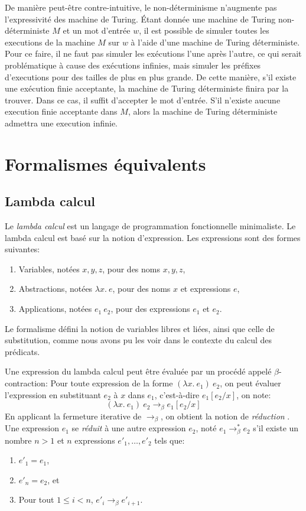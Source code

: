 De manière peut-être contre-intuitive, le non-déterminisme n'augmente pas l'expressivité des machine de Turing.
Étant donnée une machine de Turing non-déterministe $M$ et un mot d'entrée $w$, il est possible de simuler toutes les executions de la machine $M$ sur $w$ à l'aide d'une machine de Turing déterministe.
Pour ce faire, il ne faut pas simuler les exécutions l'une après l'autre, ce qui serait problématique à cause des exécutions infinies, mais simuler les préfixes d'executions pour des tailles de plus en plus grande.
De cette manière, s'il existe une exécution finie acceptante, la machine de Turing déterministe finira par la trouver.
Dans ce cas, il suffit d'accepter le mot d'entrée.
S'il n'existe aucune execution finie acceptante dans $M$, alors la machine de Turing déterministe admettra une execution infinie.

\section{Formalismes équivalents}

\subsection{Lambda calcul}

Le \og \textit{lambda calcul} \fg{} est un langage de programmation fonctionnelle minimaliste.
Le lambda calcul est basé sur la notion d'expression. Les expressions sont des formes suivantes:
\begin{enumerate}
\item Variables, notées $x, y, z$, pour des noms $x, y, z$,
\item Abstractions, notées $\lambda x. \ e$, pour des noms $x$ et expressions $e$,
\item Applications, notées $e_1\ e_2$, pour des expressions $e_1$ et $e_2$.
\end{enumerate}
Le formalisme défini la notion de variables libres et liées, ainsi que celle de substitution, comme nous avons pu les voir dans le contexte du calcul des prédicats.

Une expression du lambda calcul peut être évaluée par un procédé appelé $\beta$-contraction:
Pour toute expression de la forme $(\lambda x.\ e_1)\ e_2$, on peut évaluer l'expression en substituant $e_2$ à $x$ dans $e_1$, c'est-à-dire $e_1[e_2 / x]$, on note:
\[
(\lambda x.\ e_1)\ e_2 \to_\beta e_1[e_2 / x]
\]
En applicant la fermeture iterative de ${\to_\beta}$, on obtient la notion de \og \textit{réduction} \fg{}.
Une expression $e_1$ se \og \textit{réduit} \fg{} à une autre expression $e_2$, noté $e_1 \to_\beta^* e_2$ s'il existe un nombre $n > 1$ et $n$ expressions $e'_1, \dots, e'_2$ tels que:
\begin{enumerate}
\item $e'_1 = e_1$,
\item $e'_n = e_2$, et
\item Pour tout $1 \leq i < n$, $e'_i \to_\beta e'_{i+1}$.
\end{enumerate}

